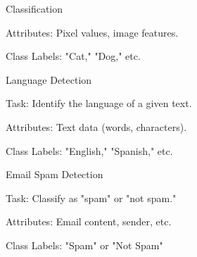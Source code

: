 \documentclass[aspectratio=169]{beamer}
\begin{document}
\begin{frame}{Classification}
\begin{minipage}[t]{.49\textwidth}
\begin{tugitemize}
\begin{tugitemize}
                \item \scriptsize Attributes: Pixel values, image features.
                \item \scriptsize Class Labels: "Cat," "Dog," etc.
            \end{tugitemize}
            \item \small Language Detection
            \begin{tugitemize}
                \item \scriptsize Task: Identify the language of a given text.
                \item \scriptsize Attributes: Text data (words, characters).
                \item \scriptsize Class Labels: "English," "Spanish," etc.
            \end{tugitemize}
            \item \small Email Spam Detection
            \begin{tugitemize}
                \item \scriptsize Task: Classify as "spam" or "not spam."
                \item \scriptsize Attributes: Email content, sender, etc.
                \item \scriptsize Class Labels: "Spam" or "Not Spam"
            \end{tugitemize}
        \end{tugitemize}
    \end{minipage}

\end{frame}
\end{document}
